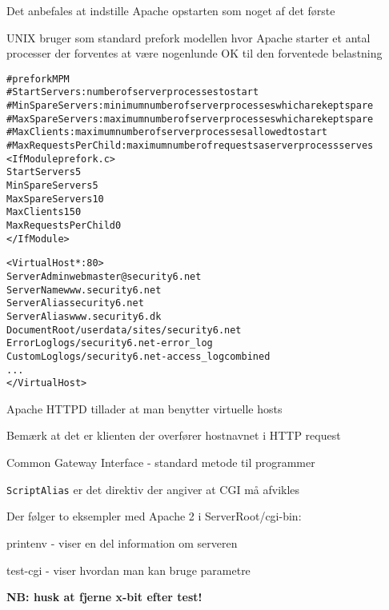 
\begin{list1}
\item Det anbefales at indstille Apache opstarten som noget af det
  første
\item UNIX bruger som standard prefork modellen hvor Apache starter et
  antal processer der forventes at være nogenlunde OK til den
  forventede belastning 
\end{list1}

\begin{alltt}
\small
# prefork MPM
# StartServers: number of server processes to start
# MinSpareServers: minimum number of server processes which are kept spare
# MaxSpareServers: maximum number of server processes which are kept spare
# MaxClients: maximum number of server processes allowed to start
# MaxRequestsPerChild: maximum number of requests a server process serves
<IfModule prefork.c>
StartServers         5
MinSpareServers      5
MaxSpareServers     10
MaxClients         150
MaxRequestsPerChild  0
</IfModule>
\end{alltt}


\begin{alltt}
<VirtualHost *:80>
    ServerAdmin webmaster@security6.net
    ServerName www.security6.net
    ServerAlias security6.net
    ServerAlias www.security6.dk
    DocumentRoot /userdata/sites/security6.net
    ErrorLog logs/security6.net-error_log
    CustomLog logs/security6.net-access_log combined
...
</VirtualHost>
\end{alltt}

\begin{list1}
\item Apache HTTPD tillader at man benytter virtuelle hosts
\item Bemærk at det er klienten der overfører hostnavnet i HTTP request
\end{list1}




\begin{list1}
\item Common Gateway Interface - standard metode til programmer
\item \verb+ScriptAlias+ er det direktiv der angiver at CGI må
 afvikles
\item Der følger to eksempler med Apache 2 i ServerRoot/cgi-bin:
\begin{list2}
\item printenv - viser en del information om serveren
\item test-cgi - viser hvordan man kan bruge parametre  
\end{list2}
\item {\bf NB: husk at fjerne x-bit efter test!}
\end{list1}


